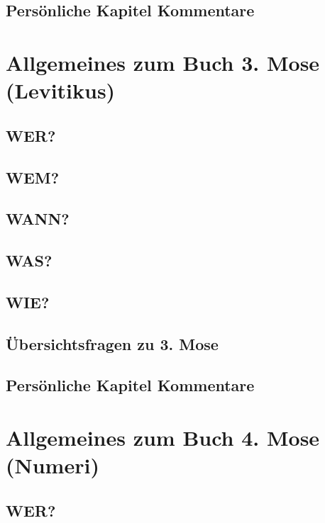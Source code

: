 \subsection{Persönliche Kapitel Kommentare}
    
\section{Allgemeines zum Buch 3. Mose (Levitikus)}
\subsection{WER?}
\subsection{WEM?}
\subsection{WANN?}
\subsection{WAS?}
\subsection{WIE?}
\subsection{Übersichtsfragen zu 3. Mose}
    
\subsection{Persönliche Kapitel Kommentare}
\section{Allgemeines zum Buch 4. Mose (Numeri)}
\subsection{WER?}

